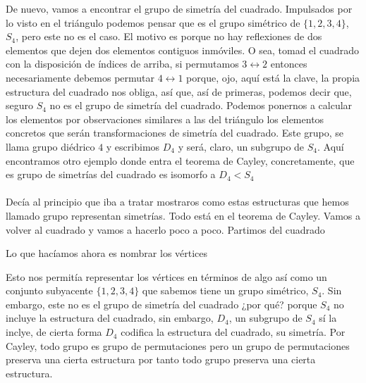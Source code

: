 \documentclass[12pt]{article}
\begin{document}
De nuevo, vamos a encontrar el grupo de simetría del cuadrado. Impulsados por lo visto en el triángulo podemos pensar que es el grupo simétrico de $\{1,2,3,4\}$, $S_4$, pero este no es el caso. El motivo es porque no hay reflexiones de dos elementos que dejen dos elementos contiguos inmóviles. O sea, tomad el cuadrado con la disposición de índices de arriba, si permutamos $3\leftrightarrow 2$ entonces necesariamente debemos permutar $4\leftrightarrow 1$ porque, ojo, aquí está la clave, la propia estructura del cuadrado nos obliga, así que, así de primeras, podemos decir que, seguro $S_4$ no es el grupo de simetría del cuadrado. Podemos ponernos a calcular los elementos por observaciones similares a las del triángulo los elementos concretos que serán transformaciones de simetría del cuadrado. Este grupo, se llama grupo diédrico $4$ y escribimos $D_4$ y será, claro, un subgrupo de $S_4$. Aquí encontramos otro ejemplo donde entra el teorema de Cayley, concretamente, que es grupo de simetrías del cuadrado es isomorfo a $D_4 < S_4$ \\\\
Decía al principio que iba a tratar mostraros como estas estructuras que hemos llamado grupo representan simetrías. Todo está en el teorema de Cayley. Vamos a volver al cuadrado y vamos a hacerlo poco a poco. Partimos del cuadrado 
\begin{center}
\end{center} 
Lo que hacíamos ahora es nombrar los vértices 
\begin{center}
\end{center} 
Esto nos permitía representar los vértices en términos de algo así como un conjunto subyacente $\{1,2,3,4\}$ que sabemos tiene un grupo simétrico, $S_4$. Sin embargo, este no es el grupo de simetría del cuadrado ¿por qué? porque $S_4$ no incluye la estructura del cuadrado, sin embargo, $D_4$, un subgrupo de $S_4$ sí la inclye, de cierta forma $D_4$ codifica la estructura del cuadrado, su simetría. Por Cayley, todo grupo es grupo de permutaciones pero un grupo de permutaciones preserva una cierta estructura por tanto todo grupo preserva una cierta estructura.
\end{document}
